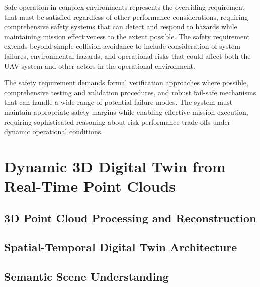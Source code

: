Safe operation in complex environments represents the overriding requirement that must be satisfied regardless of other performance considerations, requiring comprehensive safety systems that can detect and respond to hazards while maintaining mission effectiveness to the extent possible. The safety requirement extends beyond simple collision avoidance to include consideration of system failures, environmental hazards, and operational risks that could affect both the UAV system and other actors in the operational environment.

The safety requirement demands formal verification approaches where possible, comprehensive testing and validation procedures, and robust fail-safe mechanisms that can handle a wide range of potential failure modes. The system must maintain appropriate safety margins while enabling effective mission execution, requiring sophisticated reasoning about risk-performance trade-offs under dynamic operational conditions.

\section{Dynamic 3D Digital Twin from Real-Time Point Clouds}

\subsection{3D Point Cloud Processing and Reconstruction}

\subsection{Spatial-Temporal Digital Twin Architecture}

\subsection{Semantic Scene Understanding}

